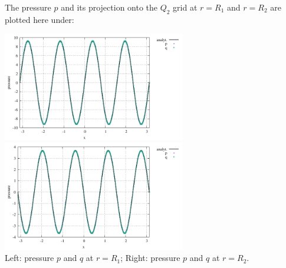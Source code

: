 The pressure $p$ and its projection onto the $Q_2$ grid at 
$r=R_1$ and $r=R_2$ are plotted here under:

\begin{center}
\includegraphics[width=8cm]{python_codes/fieldstone_21/RESULTS/pressure_R1.pdf}
\includegraphics[width=8cm]{python_codes/fieldstone_21/RESULTS/pressure_R2.pdf}\\
{\captionfont Left: pressure $p$ and $q$ at $r=R_1$; Right: 
pressure $p$ and $q$ at $r=R_2$.}
\end{center}

